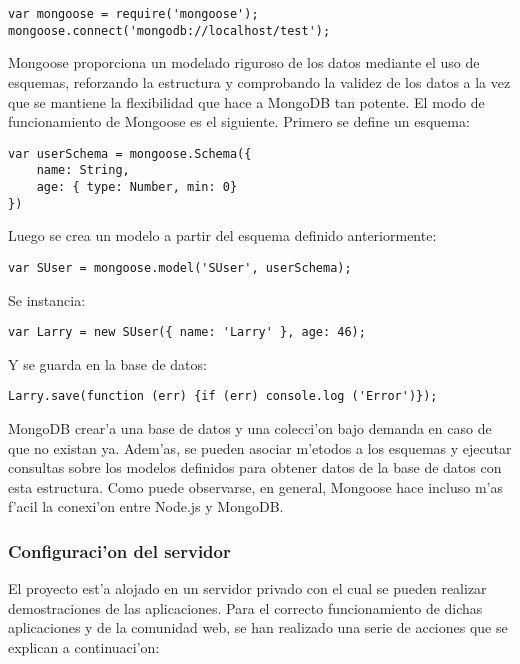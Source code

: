 \begin{verbatim}
var mongoose = require('mongoose');
mongoose.connect('mongodb://localhost/test');
\end{verbatim}

Mongoose proporciona un modelado riguroso de los datos mediante el uso de esquemas, reforzando la estructura
y comprobando la validez de los datos a la vez que se mantiene la flexibilidad que hace a MongoDB tan
potente. El modo de funcionamiento de Mongoose es el siguiente. Primero se define un esquema:

\begin{verbatim}
var userSchema = mongoose.Schema({
    name: String,
    age: { type: Number, min: 0}
})
\end{verbatim}

Luego se crea un modelo a partir del esquema definido anteriormente:

\begin{verbatim}
var SUser = mongoose.model('SUser', userSchema);
\end{verbatim}

Se instancia:

\begin{verbatim}
var Larry = new SUser({ name: 'Larry' }, age: 46);
\end{verbatim}

Y se guarda en la base de datos:

\begin{verbatim}
Larry.save(function (err) {if (err) console.log ('Error')});
\end{verbatim}

MongoDB crear'a una base de datos y una colecci'on bajo demanda en caso de que no existan ya. Adem'as, se pueden
asociar m'etodos a los esquemas y ejecutar consultas sobre los modelos definidos para obtener datos de la base
de datos con esta estructura. Como puede observarse, en general, Mongoose hace incluso m'as f'acil la conexi'on
entre Node.js y MongoDB.


\subsubsection{Configuraci'on del servidor}
\label{sub:configuracion_del_servidor}
El proyecto \Nipponline{} est'a alojado en un servidor privado con el cual se pueden realizar demostraciones de las aplicaciones.
Para el correcto funcionamiento de dichas aplicaciones y de la comunidad web, se han realizado una serie de acciones que se explican 
a continuaci'on:
